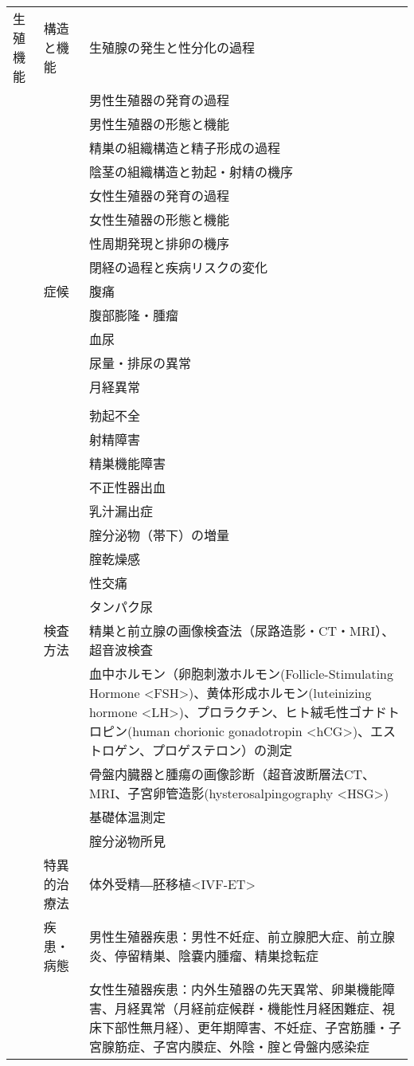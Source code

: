 \documentclass[
]{ltjsarticle}
\begin{document}
\begin{xltabular}{\linewidth}{XXX}
生殖機能 & 構造と機能 & 生殖腺の発生と性分化の過程 \\
 &  & 男性生殖器の発育の過程 \\
 &  & 男性生殖器の形態と機能 \\
 &  & 精巣の組織構造と精子形成の過程 \\
 &  & 陰茎の組織構造と勃起・射精の機序 \\
 &  & 女性生殖器の発育の過程 \\
 &  & 女性生殖器の形態と機能 \\
 &  & 性周期発現と排卵の機序 \\
 &  & 閉経の過程と疾病リスクの変化 \\
 & 症候 & 腹痛 \\
 &  & 腹部膨隆・腫瘤 \\
 &  & 血尿 \\
 &  & 尿量・排尿の異常 \\
 &  & 月経異常 \\
 &  &  \\
 &  & 勃起不全 \\
 &  & 射精障害 \\
 &  & 精巣機能障害 \\
 &  & 不正性器出血 \\
 &  & 乳汁漏出症 \\
 &  & 腟分泌物（帯下）の増量 \\
 &  & 腟乾燥感 \\
 &  & 性交痛 \\
 &  & タンパク尿 \\
 & 検査方法 & 精巣と前立腺の画像検査法（尿路造影・CT・MRI）、超音波検査 \\
 &  & 血中ホルモン（卵胞刺激ホルモン(Follicle-Stimulating Hormone <FSH>)、黄体形成ホルモン(luteinizing hormone <LH>)、プロラクチン、ヒト絨毛性ゴナドトロピン(human chorionic gonadotropin <hCG>)、エストロゲン、プロゲステロン）の測定 \\
 &  & 骨盤内臓器と腫瘍の画像診断（超音波断層法CT、MRI、子宮卵管造影(hysterosalpingography <HSG>) \\
 &  & 基礎体温測定 \\
 &  & 腟分泌物所見 \\
 & 特異的治療法 & 体外受精―胚移植<IVF-ET> \\
 & 疾患・病態 & 男性生殖器疾患：男性不妊症、前立腺肥大症、前立腺炎、停留精巣、陰嚢内腫瘤、精巣捻転症 \\
 &  & 女性生殖器疾患：内外生殖器の先天異常、卵巣機能障害、月経異常（月経前症候群・機能性月経困難症、視床下部性無月経）、更年期障害、不妊症、子宮筋腫・子宮腺筋症、子宮内膜症、外陰・腟と骨盤内感染症 \\

\end{xltabular}
\end{document}
